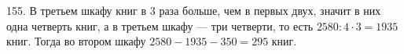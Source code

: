 155. В третьем шкафу книг в 3 раза больше, чем в первых двух, значит в них одна четверть книг, а в третьем шкафу --- три четверти, то есть $2580:4\cdot3=1935$ книг. Тогда во втором шкафу $2580-1935-350=295$ книг.\\
